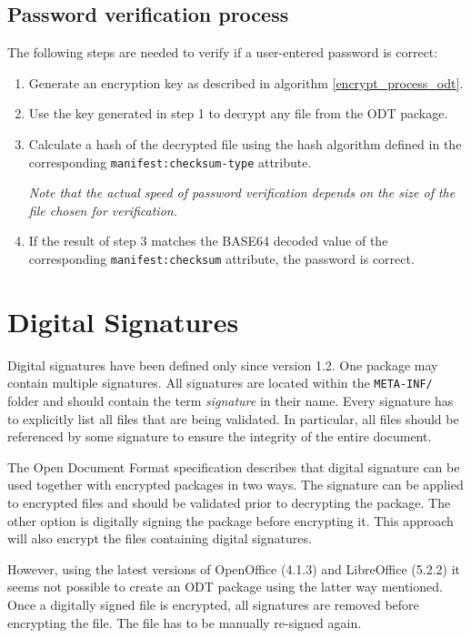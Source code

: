 \documentclass[11pt,oneside]{fithesis2}
\begin{document}
\subsection{Password verification process}\label{odt_file_note}

The following steps are needed to verify if a user-entered password is correct:

\begin{enumerate}
\setlength\itemsep{0.1em}
	\item{Generate an encryption key as described in algorithm \ref{encrypt_process_odt}.}
	\item{Use the key generated in step 1 to decrypt any file from the ODT package.}
	\item{Calculate a hash of the decrypted file using the hash algorithm defined in the corresponding \texttt{manifest:checksum-type} attribute.}

	\textit{Note that the actual speed of password verification depends on the size of the file chosen for verification.}

	\item{If the result of step 3 matches the BASE64 decoded value of the corresponding \texttt{manifest:checksum} attribute, the password is correct.}
\end{enumerate}

\section{Digital Signatures}

Digital signatures have been defined only since version 1.2. One package may contain multiple signatures. All signatures are located within the \texttt{META-INF/} folder and should contain the term \textit{signature} in their name. Every signature has to explicitly list all files that are being validated. In particular, all files should be referenced by some signature to ensure the integrity of the entire document.

The Open Document Format specification describes that digital signature can be used together with encrypted packages in two ways. The signature can be applied to encrypted files and should be validated prior to decrypting the package. The other option is digitally signing the package before encrypting it. This approach will also encrypt the files containing digital signatures.  

However, using the latest versions of OpenOffice (4.1.3) and LibreOffice (5.2.2) it seems not possible to create an ODT package using the latter way mentioned. Once a digitally signed file is encrypted, all signatures are removed before encrypting the file. The file has to be manually re-signed again. 
\end{document}
